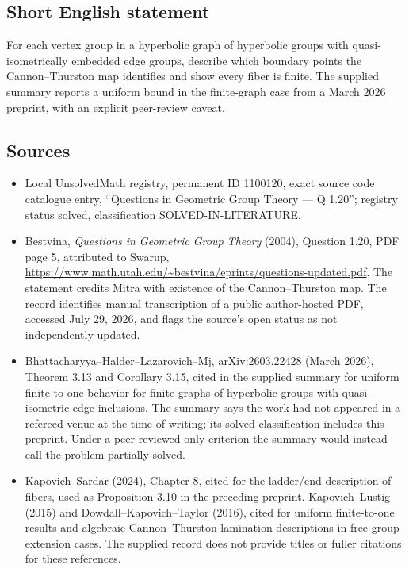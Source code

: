 \documentclass[11pt]{article}
\begin{document}
\subsection{Short English statement}
For each vertex group in a hyperbolic graph of hyperbolic groups with quasi-isometrically embedded edge groups, describe which boundary points the Cannon--Thurston map identifies and show every fiber is finite. The supplied summary reports a uniform bound in the finite-graph case from a March 2026 preprint, with an explicit peer-review caveat.
\subsection{Sources}
\begin{itemize}
\item Local UnsolvedMath registry, permanent ID 1100120, exact source code catalogue entry, ``Questions in Geometric Group Theory --- Q 1.20''; registry status solved, classification SOLVED-IN-LITERATURE.
\item Bestvina, \emph{Questions in Geometric Group Theory} (2004), Question 1.20, PDF page 5, attributed to Swarup, \url{https://www.math.utah.edu/~bestvina/eprints/questions-updated.pdf}. The statement credits Mitra with existence of the Cannon--Thurston map. The record identifies manual transcription of a public author-hosted PDF, accessed July 29, 2026, and flags the source's open status as not independently updated.
\item Bhattacharyya--Halder--Lazarovich--Mj, arXiv:2603.22428 (March 2026), Theorem 3.13 and Corollary 3.15, cited in the supplied summary for uniform finite-to-one behavior for finite graphs of hyperbolic groups with quasi-isometric edge inclusions. The summary says the work had not appeared in a refereed venue at the time of writing; its solved classification includes this preprint. Under a peer-reviewed-only criterion the summary would instead call the problem partially solved.
\item Kapovich--Sardar (2024), Chapter 8, cited for the ladder/end description of fibers, used as Proposition 3.10 in the preceding preprint. Kapovich--Lustig (2015) and Dowdall--Kapovich--Taylor (2016), cited for uniform finite-to-one results and algebraic Cannon--Thurston lamination descriptions in free-group-extension cases. The supplied record does not provide titles or fuller citations for these references.
\end{itemize}
\end{document}
